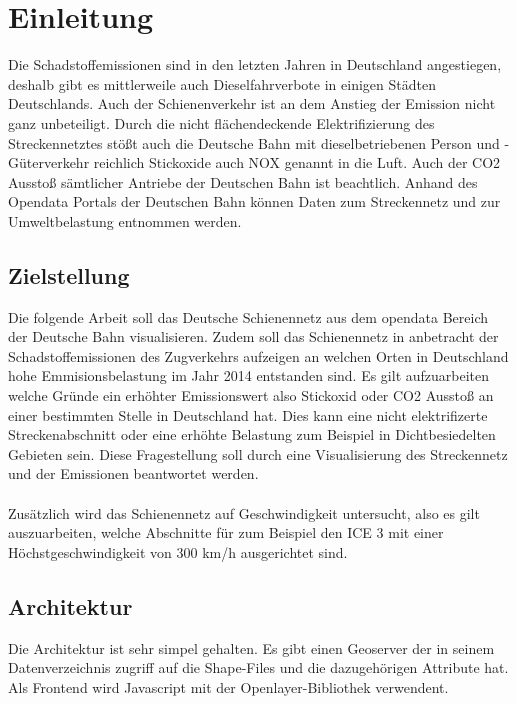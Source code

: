 \section{Einleitung}
Die Schadstoffemissionen sind in den letzten Jahren in Deutschland angestiegen, deshalb gibt es mittlerweile auch Dieselfahrverbote in einigen Städten Deutschlands.\cite{nox}
Auch der Schienenverkehr ist an dem Anstieg der Emission nicht ganz unbeteiligt. Durch die nicht flächendeckende Elektrifizierung des Streckennetztes stößt auch die Deutsche Bahn mit dieselbetriebenen Person und -Güterverkehr reichlich Stickoxide auch NOX genannt in die Luft. Auch der CO2 Ausstoß sämtlicher Antriebe der Deutschen Bahn ist beachtlich. Anhand des Opendata Portals der Deutschen Bahn \cite{dbgeodaten} können Daten zum Streckennetz und zur Umweltbelastung entnommen werden.

\subsection{Zielstellung}
Die folgende Arbeit soll das Deutsche Schienennetz aus dem opendata Bereich der Deutsche Bahn visualisieren. Zudem soll das Schienennetz in anbetracht der Schadstoffemissionen des Zugverkehrs aufzeigen an welchen Orten in Deutschland  hohe Emmisionsbelastung im Jahr 2014 entstanden sind. Es gilt aufzuarbeiten welche Gründe ein erhöhter Emissionswert also Stickoxid oder CO2 Ausstoß an einer bestimmten Stelle in Deutschland hat. Dies kann eine nicht elektrifizerte Streckenabschnitt oder eine erhöhte Belastung zum Beispiel in Dichtbesiedelten Gebieten sein. Diese Fragestellung soll durch eine Visualisierung des Streckennetz und der Emissionen beantwortet werden.
\\\\
Zusätzlich wird das Schienennetz auf Geschwindigkeit untersucht, also es gilt auszuarbeiten, welche Abschnitte für zum Beispiel den ICE 3 mit einer Höchstgeschwindigkeit von 300 km/h ausgerichtet sind.\cite{ice3}
\subsection{Architektur }
Die Architektur ist sehr simpel gehalten. Es gibt einen Geoserver der in seinem Datenverzeichnis zugriff auf die Shape-Files und die dazugehörigen Attribute hat.
Als Frontend wird Javascript mit der Openlayer-Bibliothek verwendent.\cite{openlayer}
